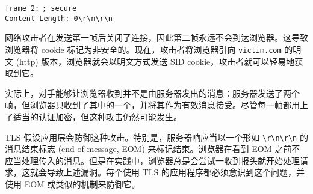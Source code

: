 \begin{snote}
\hspace*{1pt} \texttt{frame 2:}
\hspace*{10.5pt} \texttt{; secure}\\
\hspace*{85pt} \texttt{Content-Length: 0\;\;\;\textbackslash r\textbackslash n\textbackslash r\textbackslash n}

\vspace*{10pt}

\noindent
网络攻击者在发送第一帧后关闭了连接，因此第二帧永远不会到达浏览器。这导致浏览器将 cookie 标记为非安全的。现在，攻击者将浏览器引向 \texttt{victim.com} 的明文 (http) 版本，浏览器就会以明文方式发送 SID cookie，攻击者就可以轻易地获取到它。

实际上，对手能够让浏览器收到并不是由服务器发出的消息：服务器发送了两个帧，但浏览器只收到了其中的一个，并将其作为有效消息接受。尽管每一帧都用上了适当的认证加密，但这种攻击仍然可能发生。

TLS 假设应用层会防御这种攻击。特别是，服务器响应当以一个形如 \texttt{\textbackslash r\textbackslash n\textbackslash r\textbackslash n} 的消息结束标志 (end-of-message, EOM) 来标记结束。浏览器在看到 EOM 之前不应当处理传入的消息。但是在实践中，浏览器总是会尝试一收到报头就开始处理请求，这就会导致上述漏洞。每个使用 TLS 的应用程序都必须意识到这个问题，并使用 EOM 或类似的机制来防御它。
\end{snote}